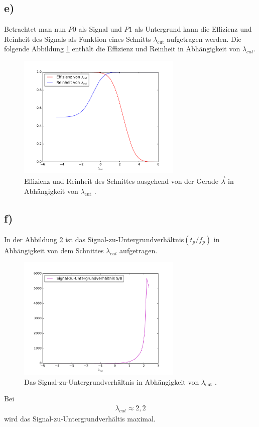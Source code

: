 \subsection{e)}
\label{subsec:a1e}
Betrachtet man nun $P0$ als Signal und $P1$ als Untergrund kann die
Effizienz und Reinheit des Signals als Funktion eines Schnitts
$\lambda_\mathrm{cut}$ aufgetragen werden.
Die folgende Abbildung \ref{fig:eff} enthält die Effizienz und
Reinheit in Abhängigkeit von $\lambda_{cut}$.

\begin{figure}
  \centering
  \includegraphics[width=0.7\textwidth]{Eff_Rein.pdf}
  \caption{Effizienz und Reinheit des Schnittes ausgehend von der Gerade $\vec \lambda$ in Abhängigkeit von $\lambda_\text{cut}$ .}
  \label{fig:eff}
\end{figure}

\FloatBarrier

\subsection{f)}
\label{subsec:a1f}
In der Abbildung \ref{fig:ver} ist das Signal-zu-Untergrundverhältnis$(t_p/f_p)$
in Abhängigkeit von dem Schnittes $\lambda_{cut}$ aufgetragen.

\begin{figure}
  \centering
  \includegraphics[width=0.7\textwidth]{verhaeltnis.pdf}
  \caption{Das Signal-zu-Untergrundverhältnis in Abhängigkeit von $\lambda_\text{cut}$ .}
  \label{fig:ver}
\end{figure}
Bei
\begin{align}
  \lambda_{cut}\approx2,2
\end{align}
wird das Signal-zu-Untergrundverhältis maximal.

